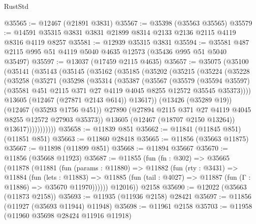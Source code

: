 \begin{lexlean}{RustStd}
\begin{coremodule}
@35565 := @12467 (@21891 @3831)
@35567 := @35398 (@35563 @35565)
@35579 := @14591 @35315 @3831 @3831 @21899 @8314 @2133 @2136 @2115 @4119 @8316 @4119 @8257
@35581 := @12939 @35315 @3831
@35594 := @35581 @487 @2115 @995 @51 @4119 @5040 @4635 @12573 (@35436 @995 @51 @5040 @35497)
@35597 := @13037 (@17459 @2115 @4635)
@35657 := @35075
    (@35100
      (@35141
        (@35143
          (@35145
            (@35162
              (@35185
                (@35202
                  (@35215
                    (@35224
                      (@35228
                        (@35258
                          (@35271
                            (@35298
                              (@35314
                                (@35387
                                  (@35567
                                    (@35579
                                      (@35594 @35597)
                                      (@35581
                                        @451
                                        @2115
                                        @371
                                        @27
                                        @4119
                                        @4045
                                        @8255
                                        @12572
                                        @35545
                                        @35373))))
                                @13605
                                (@12467 (@27871 @2143 @614))
                                @13617))
                            (@13426 (@35289 @19))
                            (@12467 (@35293 @1756 @451))
                            @27890
                            (@27894 @2115 @371 @27 @4119 @4045 @8255 @12572 @27903 @35373))
                          @13605
                          (@12467 (@18707 @2150 @13264))
                          @13617)))))))))))
@35658 := @11839 @851
@35662 := @11841 (@11845 @851) (@11851 @851)
@35663 := @11860 @28418
@35665 := @11856 (@35663 @11875)
@35667 := @11898 (@11899 @851)
@35668 := @11894 @35667
@35670 := @11856 (@35668 @11923)
@35687 := @11855
    (fun (fn : @302) =>
    @35665
      (@11878
        (@11881
          (fun (params : @11880) =>
          @11882
            (fun (rty : @3431) =>
            @11884
              (fun (lets : @11883) =>
              @11885 (fun (tail : @4027) => @11887 (fun (Γ : @11886) => @35670 @11970))))))
        @12016))
    @2158
@35690 := @12022 (@35663 (@11873 @2158))
@35693 := @11935 (@11936 @2158) @28421
@35697 := @11856 (@11927 (@35693 @11944) @11948)
@35698 := @11961 @2158
@35703 := @11958 (@11960 @35698 @28424 @11916 @11918)

\end{coremodule}
\end{lexlean}
